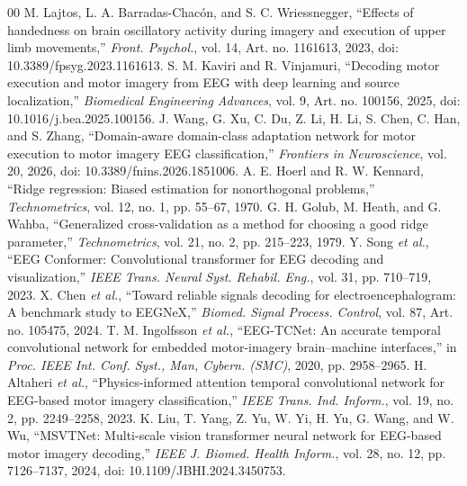 \documentclass[preprint,12pt]{elsarticle}
\begin{document}
\begin{thebibliography}{00}
 M. Lajtos, L. A. Barradas-Chacón, and S. C. Wriessnegger, ``Effects of handedness on brain oscillatory activity during imagery and execution of upper limb movements,'' \emph{Front. Psychol.}, vol. 14, Art. no. 1161613, 2023, doi: 10.3389/fpsyg.2023.1161613.
 S. M. Kaviri and R. Vinjamuri, ``Decoding motor execution and motor imagery from EEG with deep learning and source localization,'' \emph{Biomedical Engineering Advances}, vol. 9, Art. no. 100156, 2025, doi: 10.1016/j.bea.2025.100156.
 J. Wang, G. Xu, C. Du, Z. Li, H. Li, S. Chen, C. Han, and S. Zhang, ``Domain-aware domain-class adaptation network for motor execution to motor imagery EEG classification,'' \emph{Frontiers in Neuroscience}, vol. 20, 2026, doi: 10.3389/fnins.2026.1851006.
 A. E. Hoerl and R. W. Kennard, ``Ridge regression: Biased estimation for nonorthogonal problems,'' \emph{Technometrics}, vol. 12, no. 1, pp. 55--67, 1970.
 G. H. Golub, M. Heath, and G. Wahba, ``Generalized cross-validation as a method for choosing a good ridge parameter,'' \emph{Technometrics}, vol. 21, no. 2, pp. 215--223, 1979.
 Y. Song \emph{et al.}, ``EEG Conformer: Convolutional transformer for EEG decoding and visualization,'' \emph{IEEE Trans. Neural Syst. Rehabil. Eng.}, vol. 31, pp. 710--719, 2023.
 X. Chen \emph{et al.}, ``Toward reliable signals decoding for electroencephalogram: A benchmark study to EEGNeX,'' \emph{Biomed. Signal Process. Control}, vol. 87, Art. no. 105475, 2024.
 T. M. Ingolfsson \emph{et al.}, ``EEG-TCNet: An accurate temporal convolutional network for embedded motor-imagery brain--machine interfaces,'' in \emph{Proc. IEEE Int. Conf. Syst., Man, Cybern. (SMC)}, 2020, pp. 2958--2965.
 H. Altaheri \emph{et al.}, ``Physics-informed attention temporal convolutional network for EEG-based motor imagery classification,'' \emph{IEEE Trans. Ind. Inform.}, vol. 19, no. 2, pp. 2249--2258, 2023.
 K. Liu, T. Yang, Z. Yu, W. Yi, H. Yu, G. Wang, and W. Wu, ``MSVTNet: Multi-scale vision transformer neural network for EEG-based motor imagery decoding,'' \emph{IEEE J. Biomed. Health Inform.}, vol. 28, no. 12, pp. 7126--7137, 2024, doi: 10.1109/JBHI.2024.3450753.
\end{thebibliography}
\end{document}
